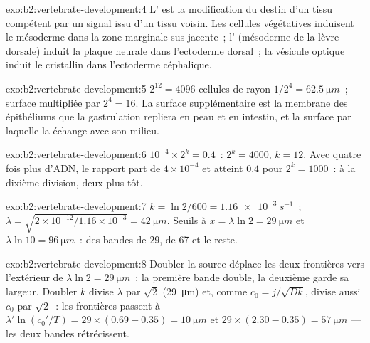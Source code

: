 \begin{solution}{exo:b2:vertebrate-development:4}
L' est la modification du destin d'un tissu compétent par un
signal issu d'un tissu voisin. Les cellules végétatives induisent le
mésoderme dans la zone marginale sus-jacente~; l' (mésoderme
de la lèvre dorsale) induit la plaque neurale dans l'ectoderme dorsal~;
la vésicule optique induit le cristallin dans l'ectoderme céphalique.
\end{solution}

\begin{solution}{exo:b2:vertebrate-development:5}
$2^{12} = 4096$ cellules de rayon $1/2^{4} = \qty{62.5}{\micro m}$~;
surface multipliée par $2^{4} = 16$. La surface supplémentaire est la
membrane des épithéliums que la gastrulation repliera en peau et en
intestin, et la surface par laquelle la  échange avec son
milieu.
\end{solution}

\begin{solution}{exo:b2:vertebrate-development:6}
$10^{-4}\times 2^{k} = 0.4$~: $2^{k} = 4000$, $k = 12$. Avec quatre fois
plus d'ADN, le rapport part de $4\times 10^{-4}$ et atteint $0.4$
pour $2^{k} = 1000$~: à la dixième division, deux plus tôt.
\end{solution}

\begin{solution}{exo:b2:vertebrate-development:7}
$k = \ln 2/600 = \qty{1.16e-3}{s^{-1}}$~; $\lambda = \sqrt{2\times
10^{-12}/1.16\times 10^{-3}} = \qty{42}{\micro m}$. Seuils à
$x = \lambda\ln 2 = \qty{29}{\micro m}$ et $\lambda\ln 10 =
\qty{96}{\micro m}$~: des bandes de 29, de 67 et le reste.
\end{solution}

\begin{solution}{exo:b2:vertebrate-development:8}
Doubler la source déplace les deux frontières vers l'extérieur de
$\lambda\ln
2 = \qty{29}{\micro m}$~: la première bande double, la deuxième garde sa
largeur. Doubler $k$ divise $\lambda$ par $\sqrt 2$
(\qty{29}{\micro m}) et, comme $c_0 = j/\sqrt{Dk}$, divise aussi $c_0$
par $\sqrt 2$~: les frontières passent à $\lambda'\ln(c_0'/T) =
29\times(0.69 - 0.35) = \qty{10}{\micro m}$ et $29\times(2.30 -
0.35) = \qty{57}{\micro m}$ --- les deux bandes rétrécissent.
\end{solution}

